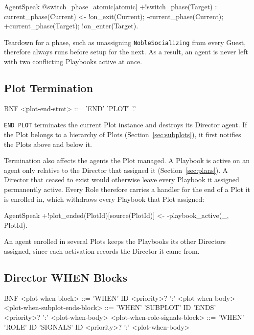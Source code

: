 \begin{codeblock}[]{AgentSpeak}
@switch_phase_atomic[atomic]
+!switch_phase(Target) : current_phase(Current) <-
    !on_exit(Current);
    -current_phase(Current);
    +current_phase(Target);
    !on_enter(Target).
\end{codeblock}
 
Teardown for a phase, such as unassigning \lstinline|NobleSocializing| from every Guest, therefore always runs before setup for the next. As a result, an agent is never left with two conflicting Playbooks active at once.
 
\subsection{Plot Termination}
\label{sec:plot-termination}
 
\begin{codeblock}[]{BNF}
    <plot-end-stmt>          ::= 'END' 'PLOT' '.'
\end{codeblock}
 
\lstinline|END PLOT| terminates the current Plot instance and destroys its Director agent. If the Plot belongs to a hierarchy of Plots (Section~\ref{sec:subplots}), it first notifies the Plots above and below it.
 
Termination also affects the agents the Plot managed. A Playbook is active on an agent only relative to the Director that assigned it (Section~\ref{sec:plans}). A Director that ceased to exist would otherwise leave every Playbook it assigned permanently active. Every Role therefore carries a handler for the end of a Plot it is enrolled in, which withdraws every Playbook that Plot assigned:
 
\begin{codeblock}[]{AgentSpeak}
+!plot_ended(PlotId)[source(PlotId)] <-
    -playbook_active(_, PlotId).
\end{codeblock}
 
An agent enrolled in several Plots keeps the Playbooks its other Directors assigned, since each activation records the Director it came from.
 
\subsection{Director WHEN Blocks}
 
\label{sec:director-when}
\begin{codeblock}[]{BNF}
    <plot-when-block>                 ::= 'WHEN' ID <priority>? ':' <plot-when-body>
    <plot-when-subplot-ends-block>     ::= 'WHEN' 'SUBPLOT' ID 'ENDS' <priority>? ':' <plot-when-body>
    <plot-when-role-signals-block>     ::= 'WHEN' 'ROLE' ID 'SIGNALS' ID <priority>? ':' <plot-when-body>
\end{codeblock}
 
